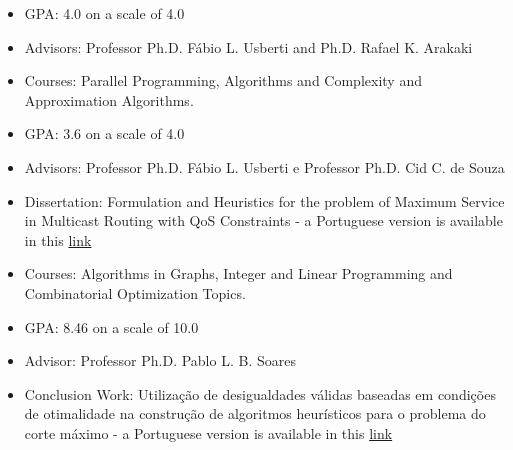 \documentclass[10pt,a4paper,ragged2e,withhyper]{altacv}
\begin{document}
    \begin{paracol}{1}
            \medskip
            \medskip
            \begin{itemize}
            \item{GPA: 4.0 on a scale of 4.0}
			      \item{Advisors: Professor Ph.D. Fábio L. Usberti and Ph.D. Rafael K. Arakaki}
			      \item{Courses: \textcolor{SecondaryColor}{Parallel Programming},
                \textcolor{SecondaryColor}{Algorithms and Complexity} and
                \textcolor{SecondaryColor}{Approximation Algorithms}.}
		      \end{itemize}
            \divider
            \medskip
            \begin{itemize}
            \item{GPA: 3.6 on a scale of 4.0}
			      \item{Advisors: Professor Ph.D. Fábio L. Usberti e Professor Ph.D. Cid C. de Souza}
			      \item{Dissertation: Formulation and Heuristics for the problem of
                Maximum Service in Multicast Routing with QoS Constraints -
                a Portuguese version is available in this \href{https://hdl.handle.net/20.500.12733/1641777}{\textcolor{ThirdColor}{link}}}
			      \item{Courses: \textcolor{SecondaryColor}{Algorithms in Graphs},
                \textcolor{SecondaryColor}{Integer and Linear Programming} and
                \textcolor{SecondaryColor}{Combinatorial Optimization Topics}.}
		      \end{itemize}
            \divider
            \begin{itemize}
            \item{GPA: 8.46 on a scale of 10.0}
          \item{Advisor: Professor Ph.D. Pablo L. B. Soares}
          \item{Conclusion Work: Utilização de desigualdades válidas baseadas
                em condições de otimalidade na construção de algoritmos
                heurísticos para o problema do corte máximo - a Portuguese
                version is available in this \href{http://www.repositorio.ufc.br/handle/riufc/39085}{\textcolor{ThirdColor}{link}}}
		      \end{itemize}
		      

\end{paracol}
\end{document}

